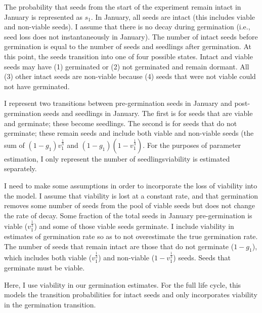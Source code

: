 \documentclass[12pt, oneside, titlepage]{article}   	%
\begin{document}
The probability that seeds from the start of the experiment remain intact in January is represented as $s_1$. In January, all seeds are intact (this includes viable and non-viable seeds). I assume that there is no decay during germination (i.e., seed loss does not instantaneously in January). The number of intact seeds before germination is equal to the number of seeds and seedlings after germination. At this point, the seeds transition into one of four possible states. Intact and viable seeds may have (1) germinated or (2) not germinated and remain dormant. All (3) other intact seeds are non-viable because (4) seeds that were not viable could not have germinated. 

I represent two transitions between pre-germination seeds in January and post-germination seeds and seedlings in January. The first is for seeds that are viable and germinate; these become seedlings. The second is for seeds that do not germinate; these remain seeds and include both viable and non-viable seeds (the sum of $(1-g_1)v_1^{\frac{1}{3}}$ and $(1-g_1)(1-v_1^{\frac{1}{3}})$. For the purposes of parameter estimation, I only represent the number of seedlings\textemdash viability is estimated separately. 

I need to make some assumptions in order to incorporate the loss of viability into the model. I assume that viability is lost at a constant rate, and that germination removes some number of seeds from the pool of viable seeds but does not change the rate of decay. Some fraction of the total seeds in January pre-germination is viable ($v_1^{\frac{1}{3}}$) and some of those viable seeds germinate. I include viability in estimates of germination rate so as to not overestimate the true germination rate. The number of seeds that remain intact are those that do not germinate ($1-g_1$), which includes both viable ($v_1^{\frac{1}{3}}$) and non-viable ($1-v_1^{\frac{1}{3}}$) seeds. Seeds that germinate must be viable. 

Here, I use viability in our germination estimates. For the full life cycle, this models the transition probabilities for intact seeds and only incorporates viability in the germination transition. 
\end{document}

